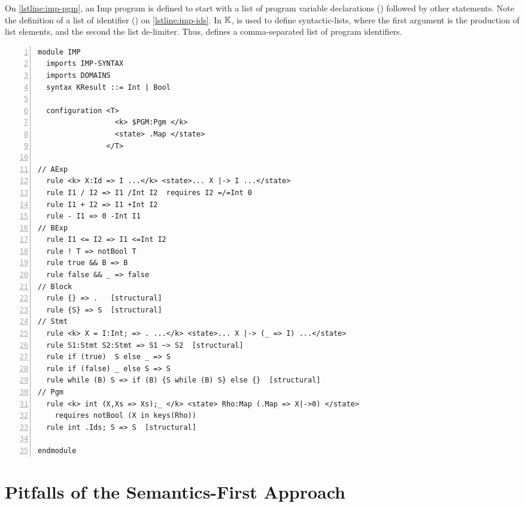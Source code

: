 On \autoref{lstline:imp-pgm}, an Imp program is defined to start with a list of program variable
declarations () followed by other statements. Note the
definition of a list of identifier () on \autoref{lstline:imp-ids}. In $\mathbb{K}{}$,
 is used to define syntactic-lists, where the first
argument is the production of list elements, and the second the list de-limiter.
Thus,  defines a comma-separated list of program identifiers.

\begin{lstlisting}[float=hb,
  frame=single,
  style=ksty,
  language=k,
  numbers=left,
  numbersep=5pt,
  caption={$\K$ Semantics of Imp},
  label={lst:imp-semantics}
]
module IMP
  imports IMP-SYNTAX
  imports DOMAINS
  syntax KResult ::= Int | Bool

  configuration <T>
                  <k> $PGM:Pgm </k>
                  <state> .Map </state>
                </T>

// AExp
  rule <k> X:Id => I ...</k> <state>... X |-> I ...</state>
  rule I1 / I2 => I1 /Int I2  requires I2 =/=Int 0
  rule I1 + I2 => I1 +Int I2
  rule - I1 => 0 -Int I1
// BExp
  rule I1 <= I2 => I1 <=Int I2
  rule ! T => notBool T
  rule true && B => B
  rule false && _ => false
// Block
  rule {} => .   [structural]
  rule {S} => S  [structural]
// Stmt
  rule <k> X = I:Int; => . ...</k> <state>... X |-> (_ => I) ...</state>
  rule S1:Stmt S2:Stmt => S1 ~> S2  [structural]
  rule if (true)  S else _ => S
  rule if (false) _ else S => S
  rule while (B) S => if (B) {S while (B) S} else {}  [structural]
// Pgm
  rule <k> int (X,Xs => Xs);_ </k> <state> Rho:Map (.Map => X|->0) </state>
    requires notBool (X in keys(Rho))
  rule int .Ids; S => S  [structural]

endmodule
\end{lstlisting}


\section{Pitfalls of the Semantics-First Approach}\label{sec:semantics-first-pitfalls}
